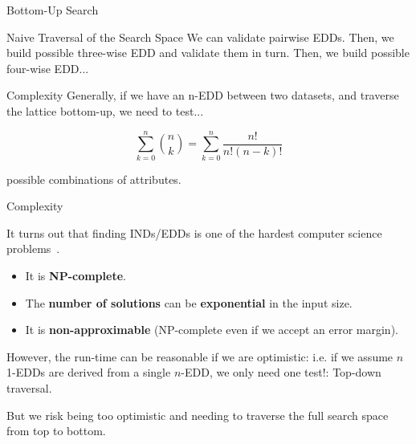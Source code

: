 \documentclass[10pt]{beamer}
\begin{document}
\begin{frame}{Bottom-Up Search}
    \begin{block}{Naive Traversal of the Search Space}
        \smallskip
        We can validate pairwise EDDs. Then, we build possible three-wise EDD and validate them in turn.
        Then, we build possible four-wise EDD...
    \end{block}
        
    \begin{alertblock}{Complexity}
    \smallskip
    Generally, if we have an n-EDD between two datasets, and traverse the lattice bottom-up, we need
    to test...
    
    \begin{equation*}
        \sum_{k=0}^{n}{\binom{n}{k}} = \sum_{k=0}^{n} \frac{n!}{n!(n - k)!}
    \end{equation*}
    
    possible combinations of attributes.
    \end{alertblock}
\end{frame}

\begin{frame}{Complexity}

    It turns out that finding INDs/EDDs is one of the hardest computer science
    problems~\cite{Blsius2017}.
    
    \begin{itemize}
        \item It is \textbf{NP-complete}.
        \item The \textbf{number of solutions} can be \textbf{exponential} in the input size.
        \item It is \textbf{non-approximable} (NP-complete even if we accept an error margin).
    \end{itemize}
    
    \bigskip
    
    However, the run-time can be reasonable if we are optimistic: i.e. if we assume
    $n$ 1-EDDs are derived from a single $n$-EDD, we only need one test!: Top-down traversal.
    
    \bigskip
    
    But we risk being too optimistic and needing to traverse the full search space from top to bottom.
\end{frame}
\end{document}
